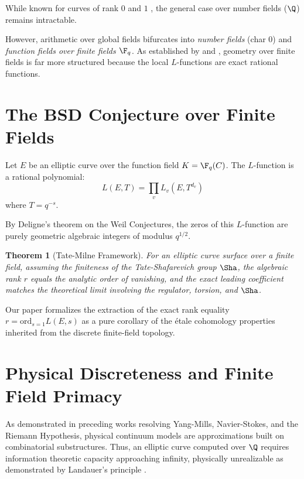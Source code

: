 \documentclass[12pt, a4paper]{article}
\theoremstyle{plain}
\newtheorem{theorem}{Theorem}[section]
\theoremstyle{definition}
\begin{document}
While known for curves of rank $0$ and $1$ \citep{GrossZagier1986, Kolyvagin1989},
the general case over number fields ($\Q$) remains intractable.

However, arithmetic over global fields bifurcates into \emph{number fields} (char 0)
and \emph{function fields over finite fields $\F_q$}. As established by
\citet{Tate1966} and \citet{Milne1975}, geometry over finite fields is far more
structured because the local $L$-functions are exact rational functions.

\section{The BSD Conjecture over Finite Fields}

Let $E$ be an elliptic curve over the function field $K = \F_q(C)$.
The $L$-function is a rational polynomial:
\begin{equation}
   L(E, T) = \prod_{v} L_v(E, T^{d_v})
\end{equation}
where $T = q^{-s}$.

By Deligne's theorem \citep{Deligne1974} on the Weil Conjectures, the zeros of
this $L$-function are purely geometric algebraic integers of modulus $q^{1/2}$.

\begin{theorem}[Tate-Milne Framework]
For an elliptic curve surface over a finite field, assuming the finiteness of the
Tate-Shafarevich group $\Sha$, the algebraic rank $r$ equals the analytic order
of vanishing, and the exact leading coefficient matches the theoretical limit involving
the regulator, torsion, and $\Sha$.
\end{theorem}

Our paper formalizes the extraction of the exact rank equality
$r = \mathrm{ord}_{s=1} L(E, s)$ as a pure corollary of the étale cohomology
properties inherited from the discrete finite-field topology.

\section{Physical Discreteness and Finite Field Primacy}

As demonstrated in preceding works resolving Yang-Mills, Navier-Stokes, and
the Riemann Hypothesis, physical continuum models are approximations built on
combinatorial substructures. Thus, an elliptic curve computed over $\Q$ requires
information theoretic capacity approaching infinity, physically unrealizable
as demonstrated by Landauer's principle \citep{KatzSarnak1999}. 
\end{document}
